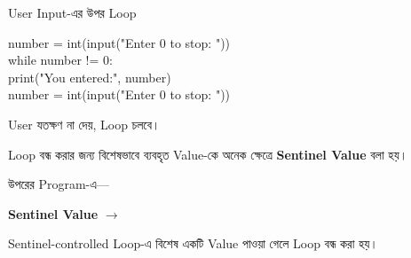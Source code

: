 \begin{examplebox}{User Input-এর উপর Loop}

\begin{codebox}
\begin{english}
\ttfamily
number = int(input("Enter 0 to stop: "))\\[0.5mm]
while number != 0:\\
\hspace*{4mm}print("You entered:", number)\\
\hspace*{4mm}number = int(input("Enter 0 to stop: "))
\end{english}
\end{codebox}

User যতক্ষণ
\textenglish{}
না দেয়, Loop চলবে।

\end{examplebox}



Loop বন্ধ করার জন্য বিশেষভাবে ব্যবহৃত Value-কে অনেক ক্ষেত্রে
\textbf{Sentinel Value} বলা হয়।

উপরের Program-এ—

\begin{center}

\textbf{Sentinel Value}
\(\longrightarrow\)
\textenglish{}

\end{center}

\begin{rememberbox}

Sentinel-controlled Loop-এ বিশেষ একটি Value পাওয়া গেলে
Loop বন্ধ করা হয়।

\end{rememberbox}



